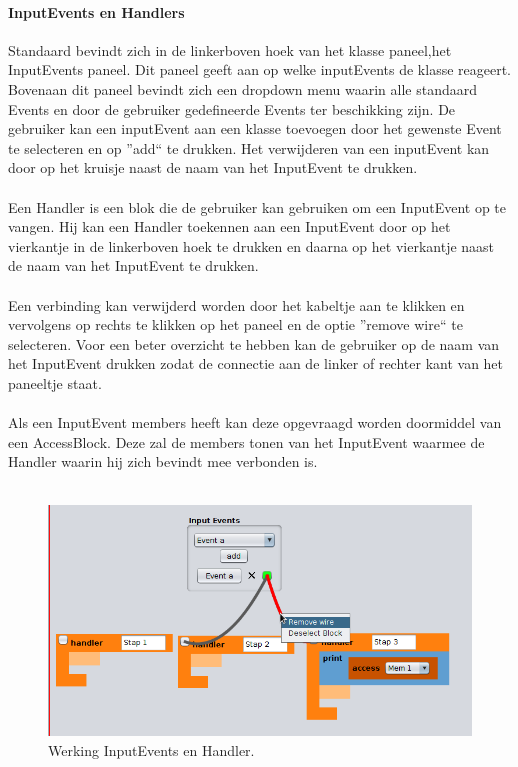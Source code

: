 \documentclass[]{article}
\begin{document}
\paragraph{InputEvents en Handlers}
Standaard bevindt zich in de linkerboven hoek van het klasse paneel,het InputEvents paneel. Dit paneel geeft aan op welke inputEvents de klasse reageert. Bovenaan dit paneel bevindt zich een dropdown menu waarin alle standaard Events en door de gebruiker gedefineerde Events ter beschikking zijn. De gebruiker kan een inputEvent aan een klasse toevoegen door het gewenste Event te selecteren en op ''add`` te drukken. Het verwijderen van een inputEvent kan door op het kruisje naast de naam van het InputEvent te drukken.\\\\
Een Handler is een blok die de gebruiker kan gebruiken om een InputEvent op te vangen. Hij kan een Handler toekennen aan een InputEvent door op het vierkantje in de linkerboven hoek te drukken en daarna op het vierkantje naast de naam van het InputEvent te drukken.\\\\
Een verbinding kan verwijderd worden door het kabeltje aan te klikken en vervolgens op rechts te klikken op het paneel en de optie ''remove wire`` te selecteren. Voor een beter overzicht te hebben kan de gebruiker op de naam van het InputEvent drukken zodat de connectie aan de linker of rechter kant van het paneeltje staat.\\\\ 
Als een InputEvent members heeft kan deze opgevraagd worden doormiddel van een AccessBlock. Deze zal de members tonen van het InputEvent waarmee de Handler waarin hij zich bevindt mee verbonden is.\\\\
\begin{figure}[H]
  \centering
\includegraphics[scale=0.3]{Documentatie/images/handlerstap}
  \caption{Werking InputEvents en Handler.} 
\end{figure}
\end{document}
